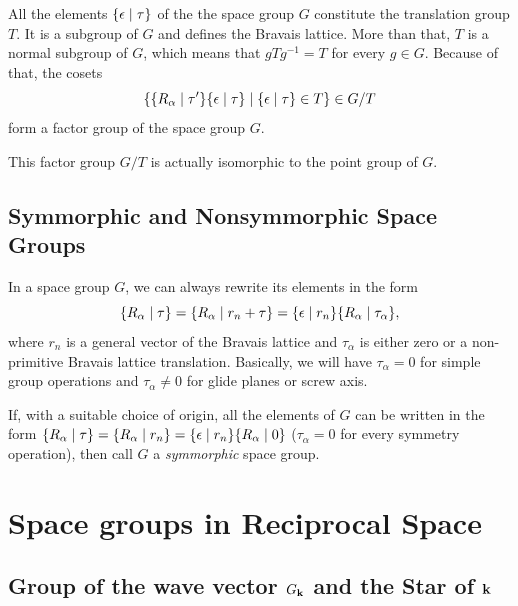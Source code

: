 All the elements $\{ \epsilon \mid \tau \}$ of the the space group $G$ constitute the translation group $T$. It is a subgroup of $G$ and defines the Bravais lattice. More than that, $T$ is a normal subgroup of $G$, which means that $g T g^{-1} = T$ for every $g \in G$. Because of that, the cosets
$$
\{ \{ R_\alpha \mid \tau' \} \{ \epsilon \mid \tau \} \mid \{ \epsilon \mid \tau \} \in T \} \in G/T
$$
form a factor group of the space group $G$.

This factor group $G/T$ is actually isomorphic to the point group of $G$.

\subsection{Symmorphic and Nonsymmorphic Space Groups}

In a space group $G$, we can always rewrite its elements in the form
$$
\{ R_\alpha \mid \tau \} = \{ R_\alpha \mid r_n + \tau \} = \{ \epsilon \mid r_n \} \{ R_\alpha \mid \tau_\alpha \},
$$
where $r_n$ is a general vector of the Bravais lattice and $\tau_\alpha$ is either zero or a non-primitive Bravais lattice translation. Basically, we will have $\tau_\alpha = 0$ for simple group operations and $\tau_\alpha \neq 0$ for glide planes or screw axis.

If, with a suitable choice of origin, all the elements of $G$ can be written in the form $\{ R_\alpha \mid \tau \} = \{ R_\alpha \mid r_n \} = \{ \epsilon \mid r_n \} \{ R_\alpha \mid 0 \}$ ($\tau_\alpha = 0$ for every symmetry operation), then call $G$ a \textit{symmorphic} space group.


\section{Space groups in Reciprocal Space}

\subsection{Group of the wave vector $G_{{\vb{k}}}$ and the Star of ${\vb{k}}$}

